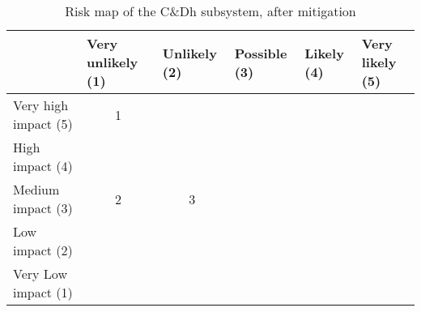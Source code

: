 \begin{table}[H]
\centering
\caption{Risk map of the C\&Dh subsystem, after mitigation}
\label{tab:risk-map-cdh-mitig}\begin{tabular}{l|c|c|c|c|c|}
\cline{2-6}
& \multicolumn{1}{l|}{Very unlikely (1)} & \multicolumn{1}{l|}{Unlikely (2)} & \multicolumn{1}{l|}{Possible (3)} & \multicolumn{1}{l|}{Likely (4)} & \multicolumn{1}{l|}{Very likely (5)} \\ \hline
\multicolumn{1}{|l|}{Very high impact (5)} & \cellcolor{rm-3}1 & \cellcolor{rm-3} & \cellcolor{rm-3} & \cellcolor{rm-3} & \cellcolor{rm-3}\\ \hline 
\multicolumn{1}{|l|}{High impact (4)} & \cellcolor{rm-2} & \cellcolor{rm-2} & \cellcolor{rm-2} & \cellcolor{rm-3} & \cellcolor{rm-3}\\ \hline 
\multicolumn{1}{|l|}{Medium impact (3)} & \cellcolor{rm-0}2 & \cellcolor{rm-1}3 & \cellcolor{rm-1} & \cellcolor{rm-2} & \cellcolor{rm-3}\\ \hline 
\multicolumn{1}{|l|}{Low impact (2)} & \cellcolor{rm-0} & \cellcolor{rm-0} & \cellcolor{rm-1} & \cellcolor{rm-2} & \cellcolor{rm-3}\\ \hline 
\multicolumn{1}{|l|}{Very Low impact (1)} & \cellcolor{rm-0} & \cellcolor{rm-0} & \cellcolor{rm-0} & \cellcolor{rm-2} & \cellcolor{rm-3}\\ \hline 
\end{tabular} 
\end{table}

